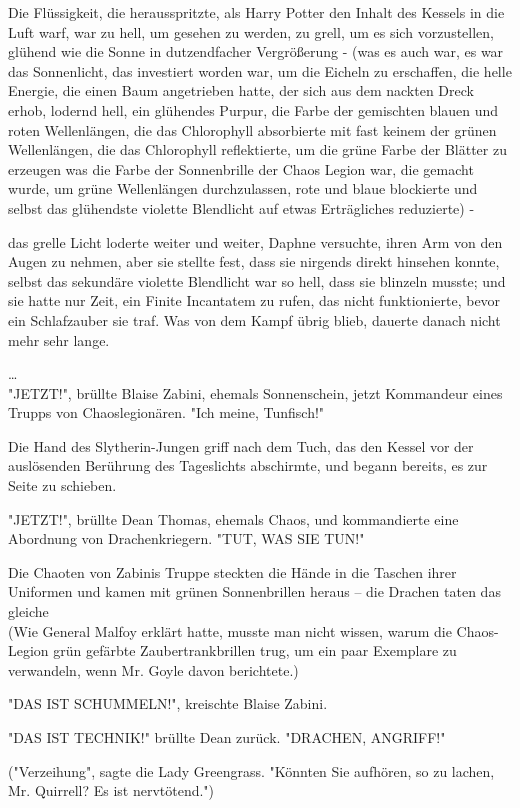 {Die Flüssigkeit, die herausspritzte, als Harry Potter den Inhalt des Kessels in die Luft warf, war zu hell, um gesehen zu werden, zu grell, um es sich vorzustellen, glühend wie die Sonne in dutzendfacher Vergrößerung - (was es auch war, es war das Sonnenlicht, das investiert worden war, um die Eicheln zu erschaffen, die helle Energie, die einen Baum angetrieben hatte, der sich aus dem nackten Dreck erhob, lodernd hell, ein glühendes Purpur, die Farbe der gemischten blauen und roten Wellenlängen, die das Chlorophyll absorbierte mit fast keinem der grünen Wellenlängen, die das Chlorophyll reflektierte, um die grüne Farbe der Blätter zu erzeugen was die Farbe der Sonnenbrille der Chaos Legion war, die gemacht wurde, um grüne Wellenlängen durchzulassen, rote und blaue blockierte und selbst das glühendste violette Blendlicht auf etwas Erträgliches reduzierte) -

das grelle Licht loderte weiter und weiter, Daphne versuchte, ihren Arm von den Augen zu nehmen, aber sie stellte fest, dass sie nirgends direkt hinsehen konnte, selbst das sekundäre violette Blendlicht war so hell, dass sie blinzeln musste; und sie hatte nur Zeit, ein Finite Incantatem zu rufen, das nicht funktionierte, bevor ein Schlafzauber sie traf. Was von dem Kampf übrig blieb, dauerte danach nicht mehr sehr lange.

…\\ "JETZT!", brüllte Blaise Zabini, ehemals Sonnenschein, jetzt Kommandeur eines Trupps von Chaoslegionären. "Ich meine, Tunfisch!"

Die Hand des Slytherin-Jungen griff nach dem Tuch, das den Kessel vor der auslösenden Berührung des Tageslichts abschirmte, und begann bereits, es zur Seite zu schieben.

"JETZT!", brüllte Dean Thomas, ehemals Chaos, und kommandierte eine Abordnung von Drachenkriegern. "TUT, WAS SIE TUN!"

Die Chaoten von Zabinis Truppe steckten die Hände in die Taschen ihrer Uniformen und kamen mit grünen Sonnenbrillen heraus -- die Drachen taten das gleiche\\ (Wie General Malfoy erklärt hatte, musste man nicht wissen, warum die Chaos-Legion grün gefärbte Zaubertrankbrillen trug, um ein paar Exemplare zu verwandeln, wenn Mr. Goyle davon berichtete.)

"DAS IST SCHUMMELN!", kreischte Blaise Zabini.

"DAS IST TECHNIK!" brüllte Dean zurück. "DRACHEN, ANGRIFF!"

("Verzeihung", sagte die Lady Greengrass. "Könnten Sie aufhören, so zu lachen, Mr. Quirrell? Es ist nervtötend.")

}
